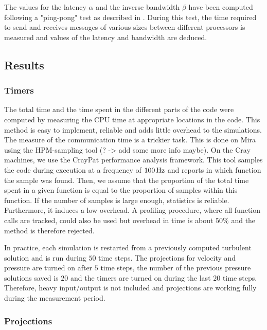 \documentclass{sig-alternate}
\begin{document}
The values for the latency $\alpha$ and the inverse bandwidth $\beta$ have been computed following a "ping-pong" test as described in \cite{fischer:scaling}. During this test, the time required to send and receives messages of various sizes between different processors is measured and values of the latency and bandwidth are deduced.


\subsection{Results}

\subsubsection{Timers}

The total time and the time spent in the different parts of the code were computed by measuring the CPU time at appropriate locations in the code. This method is easy to implement, reliable and adds little overhead to the simulations. The measure of the communication time is a trickier task. This is done on Mira using the HPM-sampling tool (? -> add some more info maybe). On the Cray machines, we use the CrayPat performance analysis framework. This tool samples the code during execution at a frequency of $\unit[100]{Hz}$ and reports in which function the sample was found. Then, we assume that the proportion of the total time spent in a given function is equal to the proportion of samples within this function. If the number of samples is large enough, statistics is reliable. Furthermore, it induces a low overhead. A profiling procedure, where all function calls are tracked, could also be used but overhead in time is about $50\%$ and the method is therefore rejected.

In practice, each simulation is restarted from a previously computed turbulent solution and is run during $50$ time steps. The projections for velocity and pressure are turned on after $5$ time steps, the number of the previous pressure solutions saved is $20$ and the timers are turned on during the last $20$ time steps. Therefore, heavy input/output is not included and projections are working fully during the measurement period.


\subsubsection{Projections}
\end{document}
